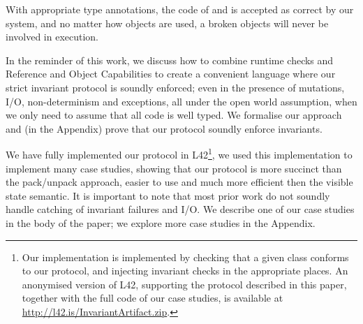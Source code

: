 With appropriate type annotations, the code of \Q@Range@ and \Q@BoxRange@ is accepted as correct by our system, and no matter how \Q@Range@ objects are used, a broken \Q@Range@ objects will never be involved in execution.

In the reminder of this work, we discuss how to combine runtime checks and Reference and Object Capabilities to create a convenient language where our strict invariant protocol is soundly enforced; even in the presence of mutations, I/O, non-determinism and exceptions, all under the open world assumption, when
we only need to assume that all code is well typed.
We formalise our approach and (in the Appendix) prove that our protocol soundly enforce invariants.

We have fully implemented our protocol in L42\footnote{
Our implementation is implemented by checking that a given class conforms to our protocol, and injecting invariant checks in the appropriate places.
An anonymised version of L42, supporting the protocol described in this paper, together with the full code of our case studies, is available at \url{http://l42.is/InvariantArtifact.zip}. %
}, we used this implementation to implement many case studies, showing that our protocol is more succinct than the pack/unpack approach, easier to use and much more efficient then the visible state semantic.
It is important to note that most prior work do not soundly handle catching of invariant failures and I/O.
We describe one of our case studies in the body of the paper; we explore more case studies in the Appendix.

